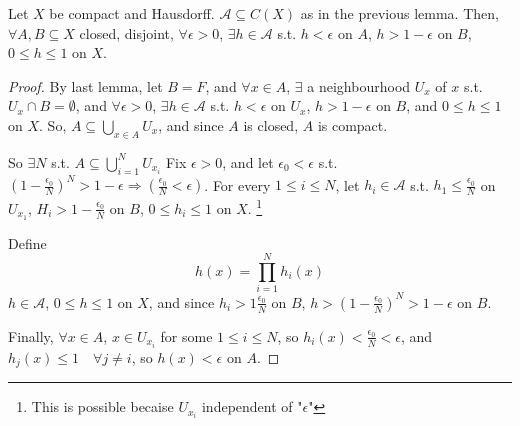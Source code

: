 \begin{lem}
    Let $X$ be compact and Hausdorff. $\mathcal{A} \subseteq C(X)$ as in the previous lemma. Then,
    $\forall A, B \subseteq X$ closed, disjoint, $\forall \epsilon > 0$, $\exists h \in \mathcal{A}$
    s.t. $h < \epsilon$ on $A$, $h > 1 - \epsilon$ on $B$, $0 \leq h \leq 1$ on $X$.          
\end{lem}
\begin{proof}
    By last lemma, let $B = F$, and $\forall x \in A$, $\exists$ a neighbourhood $U_x$ of $x$ s.t. 
    $U_x \cap B = \emptyset$, and $\forall \epsilon > 0 $, $\exists h \in \mathcal{A}$ s.t.
    $h < \epsilon$ on $U_x$, $h > 1 - \epsilon$ on $B$, and $0 \leq h \leq 1$ on $X$.
    So, $A \subseteq \bigcup_{x \in A} U_x$, and since $A$ is closed, $A$ is compact.
    
    So $\exists N$ s.t. $A \subseteq \bigcup_{i = 1}^N U_{x_i}$ Fix $\epsilon > 0$, and let 
    $\epsilon_0 < \epsilon$ s.t. $(1 - \frac{\epsilon_0}{N})^N > 1 - \epsilon \Rightarrow 
    (\frac{\epsilon_0}{N} < \epsilon)$. For every $1 \leq i \leq N$, let $h_i \in \mathcal{A}$ s.t.
    $h_1 \leq \frac{\epsilon_0}{N}$ on $U_{x_1}$, $H_i > 1 - \frac{\epsilon_0}{N}$ on $B$, 
    $0 \leq h_i \leq 1$ on $X$. \footnote{This is possible becaise $U_{x_i}$ independent of "$\epsilon$"}
    
    Define
    \[
        h(x) = \prod_{i = 1}^N h_i(x)
    \]  
    $h \in \mathcal{A}$, $0 \leq h \leq 1$ on $X$, and since $h_i > 1 \frac{\epsilon_0}{N}$ on $B$,
    $h > (1 - \frac{\epsilon_0}{N})^N > 1 - \epsilon$ on $B$.
    
    Finally, $\forall x \in A$, $x \in U_{x_i}$ for some $1 \leq i \leq N$, so $h_i(x) < \frac{\epsilon_0}{N}
    < \epsilon$, and $h_j(x) \leq 1 \quad \forall j \neq i$, so $h(x) < \epsilon$ on $A$. \qedhere       
\end{proof}



